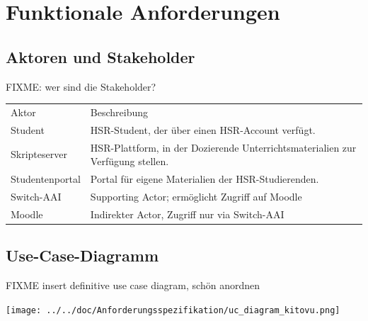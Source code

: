\documentclass[a4paper]{article}
\let\oldsection\section
\renewcommand\section{\clearpage\oldsection}
\begin{document}
\begin{landscape}
\end{landscape}

\pagebreak
\section{Funktionale Anforderungen}

\subsection{Aktoren und Stakeholder}
FIXME: wer sind die Stakeholder?

\begin{tabulary}{\linewidth}{lL}
	\toprule
	Aktor & Beschreibung\\
	Student & HSR-Student, der über einen HSR-Account verfügt.\\
	Skripteserver & HSR-Plattform, in der Dozierende Unterrichtsmaterialien zur Verfügung stellen.\\
	Studentenportal & Portal für eigene Materialien der HSR-Studierenden.\\
	Switch-AAI & Supporting Actor; ermöglicht Zugriff auf Moodle \\	
	Moodle & Indirekter Actor, Zugriff nur via Switch-AAI \\
	
	\bottomrule
\end{tabulary}

\subsection{Use-Case-Diagramm}

FIXME insert definitive use case diagram, schön anordnen

\texttt{[image: ../../doc/Anforderungsspezifikation/uc\_diagram\_kitovu.png]}
\end{document}
